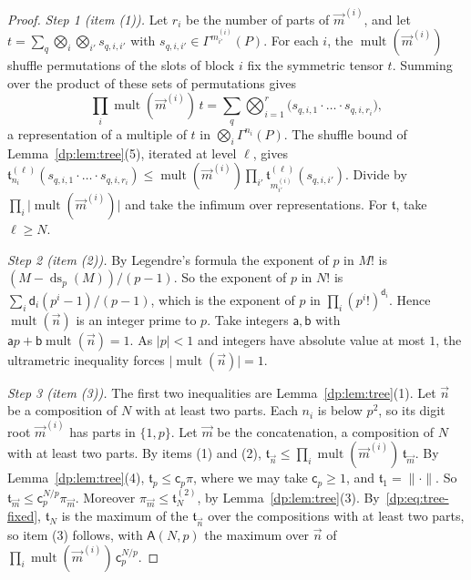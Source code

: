 \documentclass[11pt]{amsart}
\theoremstyle{definition}
\theoremstyle{remark}
\numberwithin{equation}{section}
\newcommand{\abs}[1]{\lvert #1\rvert}
\newcommand{\norm}[1]{\lVert #1\rVert}
\theoremstyle{plain}
\theoremstyle{definition}
\theoremstyle{plain}
\begin{document}
\begin{proof}
\emph{Step 1 (item (1)).} Let $r_i$ be the number of parts of $\vec m^{(i)}$, and let $t=\sum_q\bigotimes_i\bigotimes_{i'}s_{q,i,i'}$ with $s_{q,i,i'}\in\Gamma^{m^{(i)}_{i'}}(P)$. For each $i$, the $\operatorname{mult}(\vec m^{(i)})$ shuffle permutations of the slots of block $i$ fix the symmetric tensor $t$. Summing over the product of these sets of permutations gives
\[
 \prod_i\operatorname{mult}(\vec m^{(i)})\,t=\sum_q\bigotimes_{i=1}^r\bigl(s_{q,i,1}\cdot\ldots\cdot s_{q,i,r_i}\bigr),
\]
a representation of a multiple of $t$ in $\bigotimes_i\Gamma^{n_i}(P)$. The shuffle bound of Lemma~\ref{dp:lem:tree}(5), iterated at level $\ell$, gives $\mathfrak t^{(\ell)}_{n_i}(s_{q,i,1}\cdot\ldots\cdot s_{q,i,r_i})\le\operatorname{mult}(\vec m^{(i)})\prod_{i'}\mathfrak t^{(\ell)}_{m^{(i)}_{i'}}(s_{q,i,i'})$. Divide by $\prod_i\abs{\operatorname{mult}(\vec m^{(i)})}$ and take the infimum over representations. For $\mathfrak t$, take $\ell\ge N$.

\emph{Step 2 (item (2)).} By Legendre's formula the exponent of $p$ in $M!$ is $(M-\operatorname{ds}_p(M))/(p-1)$. So the exponent of $p$ in $N!$ is $\sum_i\mathsf d_i(p^i-1)/(p-1)$, which is the exponent of $p$ in $\prod_i(p^i!)^{\mathsf d_i}$. Hence $\operatorname{mult}(\vec n)$ is an integer prime to $p$. Take integers $\mathsf a,\mathsf b$ with $\mathsf ap+\mathsf b\operatorname{mult}(\vec n)=1$. As $\abs p<1$ and integers have absolute value at most $1$, the ultrametric inequality forces $\abs{\operatorname{mult}(\vec n)}=1$.

\emph{Step 3 (item (3)).} The first two inequalities are Lemma~\ref{dp:lem:tree}(1). Let $\vec n$ be a composition of $N$ with at least two parts. Each $n_i$ is below $p^2$, so its digit root $\vec m^{(i)}$ has parts in $\{1,p\}$. Let $\vec m$ be the concatenation, a composition of $N$ with at least two parts. By items (1) and (2), $\mathfrak t_{\vec n}\le\prod_i\operatorname{mult}(\vec m^{(i)})\,\mathfrak t_{\vec m}$. By Lemma~\ref{dp:lem:tree}(4), $\mathfrak t_p\le\mathsf c_p\pi$, where we may take $\mathsf c_p\ge1$, and $\mathfrak t_1=\norm\cdot$. So $\mathfrak t_{\vec m}\le\mathsf c_p^{N/p}\pi_{\vec m}$. Moreover $\pi_{\vec m}\le\mathfrak t^{(2)}_N$, by Lemma~\ref{dp:lem:tree}(3). By~\eqref{dp:eq:tree-fixed}, $\mathfrak t_N$ is the maximum of the $\mathfrak t_{\vec n}$ over the compositions with at least two parts, so item (3) follows, with $\mathsf A(N,p)$ the maximum over $\vec n$ of $\prod_i\operatorname{mult}(\vec m^{(i)})\,\mathsf c_p^{N/p}$.
\end{proof}
\end{document}
